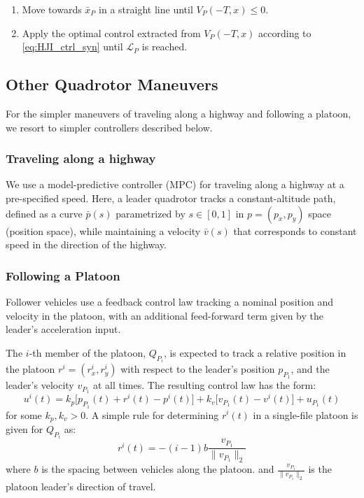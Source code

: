 \begin{enumerate}
\item Move towards $\bar{x}_P$ in a straight line until $V_P(-T,x)\le 0$.
\item Apply the optimal control extracted from $V_P(-T,x)$ according to \eqref{eq:HJI_ctrl_syn} until $\mathcal{L}_P$ is reached.
\end{enumerate}

\subsection{Other Quadrotor Maneuvers}
For the simpler maneuvers of traveling along a highway and following a platoon, we resort to simpler controllers described below.

\subsubsection{Traveling along a highway} \label{sec:travel_hwy}
We use a model-predictive controller (MPC) for traveling along a highway at a pre-specified speed. Here, a leader quadrotor tracks a constant-altitude path, defined as a curve $\bar{p}(s)$ parametrized by $s\in[0,1]$ in $p=(p_x, p_y)$ space (position space), while maintaining a velocity $\bar{v}(s)$ that corresponds to constant speed in the direction of the highway.

\subsubsection{Following a Platoon} \label{sec:follow_platoon}
Follower vehicles use a feedback control law tracking a nominal position and velocity in the platoon, with an additional feed-forward term given by the leader's acceleration input.

The $i$-th member of the platoon, $Q_{P_i}$, is expected to track a relative position in the platoon $r^i = (r_x^i,r_y^i)$ with respect to the leader's position $p_{P_1}$, and the leader's velocity $v_{P_1}$ at all times. The resulting control law has the form:
\begin{equation}\label{eq:follow}
u^i(t) = k_p \big[p_{P_1}(t) + r^i(t) - p^i(t) \big] + k_v\big[v_{P_1}(t) - v^i(t)\big] + u_{P_1}(t)
\end{equation}
for some $k_p,k_v>0$. A simple rule for determining $r^i(t)$ in a single-file platoon is given for $Q_{P_i}$ as:
\begin{equation}\label{eq:nominal_pos}
r^i(t) = - (i-1) b \frac{v_{P_1}}{\|v_{P_1}\|_2}
\end{equation}
where $b$ is the spacing between vehicles along the platoon. and $\frac{v_{P_1}}{\|v_{P_1}\|_2}$ is the platoon leader's direction of travel.

